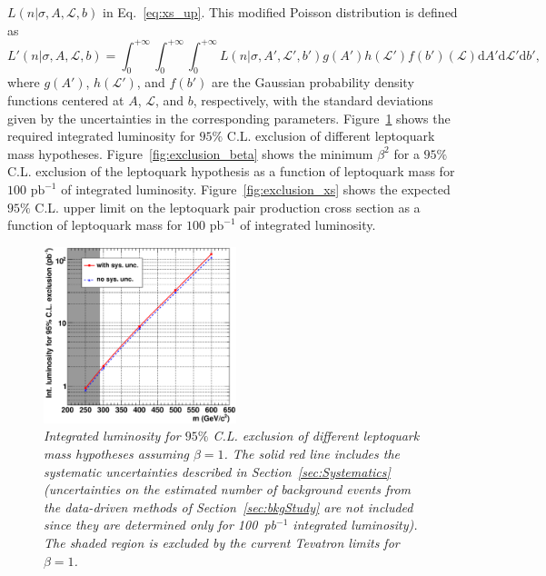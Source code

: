 $L(n|\sigma,A,\mathcal{L},b)$ in Eq.~\ref{eq:xs_up}. This modified Poisson distribution is defined as
\begin{equation}
L'(n|\sigma,A,\mathcal{L},b)=\int_0^{+\infty}\int_0^{+\infty}\int_0^{+\infty} L(n|\sigma,A',\mathcal{L}',b')g(A')h(\mathcal{L}')f(b')(\mathcal{L})\mathrm{d}A'\mathrm{d}\mathcal{L}'\mathrm{d}b',
\end{equation}
where $g(A')$, $h(\mathcal{L}')$, and $f(b')$ are the Gaussian probability density functions centered at $A$, $\mathcal{L}$, and $b$, respectively,
with the standard deviations given by the uncertainties in the corresponding parameters. Figure~\ref{fig:exclusion}
shows the required integrated luminosity for $95\%$ C.L. exclusion of different leptoquark mass hypotheses. 
Figure~\ref{fig:exclusion_beta} shows the minimum $\beta^2$ for a $95\%$ C.L. exclusion of the leptoquark hypothesis 
as a function of leptoquark mass for $100\text{ pb}^{-1}$ of integrated luminosity.
Figure~\ref{fig:exclusion_xs}
shows the expected $95\%$ C.L. upper limit on the leptoquark pair production cross section as a function of leptoquark mass for $100\text{ pb}^{-1}$
of integrated luminosity. 

\begin{figure}[h!]
 \centering
  \includegraphics[width=0.5\textwidth]{plots/cmsPotential/L95CL_vs_m_log.eps}
 \caption{\small \sl Integrated luminosity
for $95\%$ C.L. exclusion of different leptoquark mass hypotheses assuming $\beta=1$. 
The solid red line includes the systematic uncertainties described in Section~\ref{sec:Systematics}
(uncertainties on the estimated number of background events from the data-driven methods
of Section~\ref{sec:bkgStudy} are not included since they are determined only for 100~pb$^{-1}$ integrated luminosity). 
The shaded region is excluded by the current Tevatron limits for $\beta=1$.\label{fig:exclusion}}
\end{figure}

